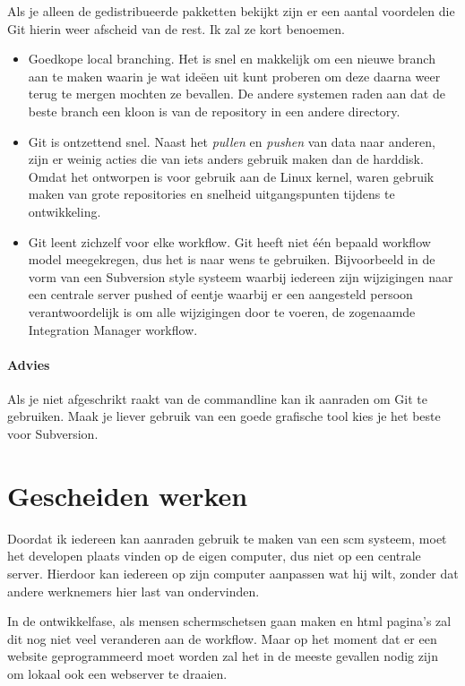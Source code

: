 Als je alleen de gedistribueerde pakketten bekijkt zijn er een aantal voordelen die Git hierin weer afscheid van de rest. Ik zal ze kort benoemen.

\begin{itemize}
  \item Goedkope local branching. Het is snel en makkelijk om een nieuwe branch aan te maken waarin je wat ide\"{e}en uit kunt proberen om deze daarna weer terug te mergen mochten ze bevallen. De andere systemen raden aan dat de beste branch een kloon is van de repository in een andere directory.
  \item Git is ontzettend snel. Naast het \emph{pullen} en \emph{pushen} van data naar anderen, zijn er weinig acties die van iets anders gebruik maken dan de harddisk. Omdat het ontworpen is voor gebruik aan de Linux kernel, waren gebruik maken van grote repositories en snelheid uitgangspunten tijdens te ontwikkeling.
  \item Git leent zichzelf voor elke workflow. Git heeft niet \'{e}\'{e}n bepaald workflow model meegekregen, dus het is naar wens te gebruiken. Bijvoorbeeld in de vorm van een Subversion style systeem waarbij iedereen zijn wijzigingen naar een centrale server pushed of eentje waarbij er een aangesteld persoon verantwoordelijk is om alle wijzigingen door te voeren, de zogenaamde Integration Manager workflow.
\end{itemize}

\paragraph{Advies} Als je niet afgeschrikt raakt van de commandline kan ik aanraden om Git te gebruiken. Maak je liever gebruik van een goede grafische tool kies je het beste voor Subversion.

\section{Gescheiden werken}

Doordat ik iedereen kan aanraden gebruik te maken van een {\sc scm} systeem, moet het developen plaats vinden op de eigen computer, dus niet op een centrale server. Hierdoor kan iedereen op zijn computer aanpassen wat hij wilt, zonder dat andere werknemers hier last van ondervinden.

In de ontwikkelfase, als mensen schermschetsen gaan maken en html pagina's zal dit nog niet veel veranderen aan de workflow. Maar op het moment dat er een website geprogrammeerd moet worden zal het in de meeste gevallen nodig zijn om lokaal ook een webserver te draaien. 

